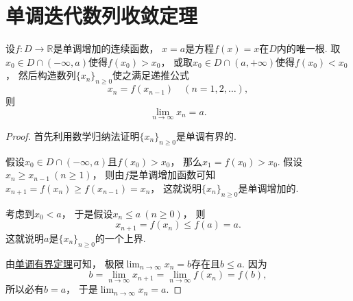 \section{单调迭代数列收敛定理}
\begin{theorem}\label{theorem:连续函数.单调迭代数列收敛定理}
设\(f\colon D\to\mathbb{R}\)是单调增加的连续函数，
\(x=a\)是方程\(f(x) = x\)在\(D\)内的唯一根.
取\(x_0 \in D \cap (-\infty,a)\)使得\(f(x_0) > x_0\)，
或取\(x_0 \in D \cap (a,+\infty)\)使得\(f(x_0) < x_0\)，
然后构造数列\(\{x_n\}_{n\geq0}\)使之满足递推公式\[
	x_n = f(x_{n-1})
	\quad(n=1,2,\dotsc),
\]
则\[
	\lim_{n\to\infty} x_n = a.
\]
\begin{proof}
首先利用数学归纳法证明\(\{x_n\}_{n\geq0}\)是单调有界的.

假设\(x_0 \in D \cap (-\infty,a)\)且\(f(x_0) > x_0\)，
那么\(x_1 = f(x_0) > x_0\).
假设\(x_n \geq x_{n-1}\ (n\geq1)\)，
则由\(f\)是单调增加函数可知
\(x_{n+1} = f(x_n) \geq f(x_{n-1}) = x_n\)，
这就说明\(\{x_n\}_{n\geq0}\)是单调增加的.

考虑到\(x_0 < a\)，
于是假设\(x_n \leq a\ (n\geq0)\)，
则\[
	x_{n+1} = f(x_n) \leq f(a) = a.
\]
这就说明\(a\)是\(\{x_n\}_{n\geq0}\)的一个上界.

由\hyperref[theorem:极限.数列的单调有界定理]{单调有界定理}可知，
极限\(\lim_{n\to\infty} x_n = b\)存在且\(b \leq a\).
因为\[
	b = \lim_{n\to\infty} x_{n+1}
	= \lim_{n\to\infty} f(x_n)
	= f(b),
\]
所以必有\(b = a\)，
于是\(\lim_{n\to\infty} x_n = a\).
\end{proof}
\end{theorem}
